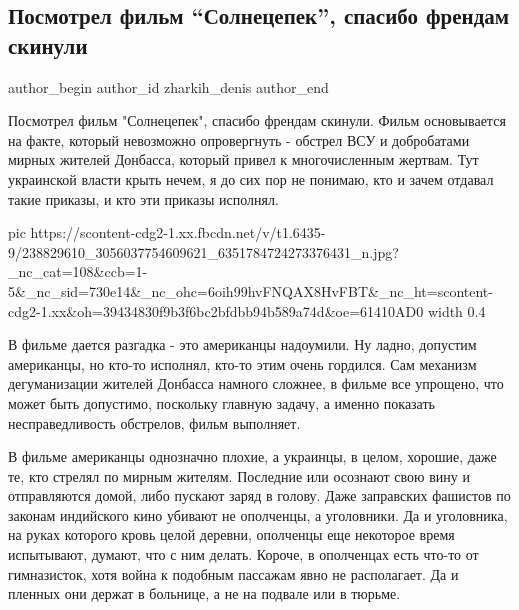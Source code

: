  
 
 
 
 
 
\subsection{Посмотрел фильм \enquote{Солнецепек}, спасибо френдам скинули}
\label{sec:16_08_2021.fb.zharkih_denis.1.solncepek_film}
 
\ifcmt
 author_begin
   author_id zharkih_denis
 author_end
\fi

Посмотрел фильм "Солнецепек", спасибо френдам скинули. Фильм основывается на
факте, который невозможно опровергнуть - обстрел ВСУ и добробатами мирных
жителей Донбасса, который привел к многочисленным жертвам. Тут украинской
власти крыть нечем, я до сих пор не понимаю, кто и зачем отдавал такие приказы,
и кто эти приказы исполнял. 

\ifcmt
  pic https://scontent-cdg2-1.xx.fbcdn.net/v/t1.6435-9/238829610_3056037754609621_6351784724273376431_n.jpg?_nc_cat=108&ccb=1-5&_nc_sid=730e14&_nc_ohc=6oih99hvFNQAX8HvFBT&_nc_ht=scontent-cdg2-1.xx&oh=39434830f9b3f6bc2bfdbb94b589a74d&oe=61410AD0
  width 0.4
\fi

В фильме дается разгадка - это американцы надоумили. Ну ладно, допустим
американцы, но кто-то исполнял, кто-то этим очень гордился. Сам механизм
дегуманизации жителей Донбасса намного сложнее, в фильме все упрощено, что
может быть допустимо, поскольку главную задачу, а именно показать
несправедливость обстрелов, фильм выполняет. 

В фильме американцы однозначно плохие, а украинцы, в целом, хорошие, даже те,
кто стрелял по мирным жителям. Последние или осознают свою вину и отправляются
домой, либо пускают заряд в голову. Даже заправских фашистов по законам
индийского кино убивают не ополченцы, а уголовники. Да и уголовника, на  руках
которого кровь целой деревни, ополченцы еще некоторое время испытывают, думают,
что с ним делать. Короче, в ополченцах есть что-то от гимназисток, хотя война к
подобным пассажам явно не располагает.  Да и пленных они держат в больнице, а
не на подвале или в тюрьме. 

